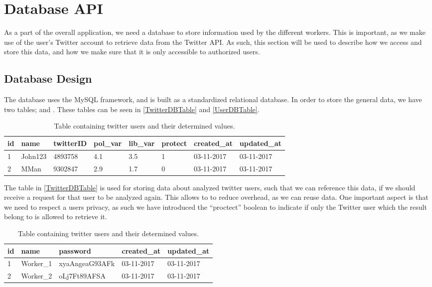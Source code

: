 \chapter{Database API}
As a part of the overall application, we need a database to store information
used by the different workers. This is important, as we make use of the
user's Twitter account to retrieve data from the Twitter API. As such, this
section will be used to describe how we access and store this data, and how we
make sure that it is only accessible to authorized users.

\section{Database Design}\label{DBDesign}
The database uses the MySQL framework, and is built as a standardized relational
database. In order to store the general data, we have two tables; 
and . These tables can be seen in \autoref{TwitterDBTable}
and \autoref{UserDBTable}.

\begin{table}[H]
\begin{tabular}{l | l | l | l | l | l | l | l	}
\textbf{id} & \textbf{name} & \textbf{twitterID} & \textbf{pol\_var} &
\textbf{lib\_var} & \textbf{protect} & \textbf{created\_at} & \textbf{updated\_at}
\\\hline 1 & John123 & 4893758 & 4.1 & 3.5 & 1 & 03-11-2017 & 03-11-2017 
\\\hline 2 & MMan & 9302847 & 2.9 & 1.7 & 0 & 03-11-2017 & 03-11-2017 
\\\hline
\end{tabular}
\caption{Table containing twitter users and their determined values.}
\label{TwitterDBTable}
\end{table}

The table in \autoref{TwitterDBTable} is used for storing data about analyzed
twitter users, such that we can reference this data, if we should receive
a request for that user to be analyzed again. This allows to to reduce overhead,
as we can reuse data. One important aspect is that we need to respect a users
privacy, as such we have introduced the ``proctect'' boolean to indicate if only
the Twitter user which the result belong to is allowed to retrieve it.

\begin{table}[H]
\begin{tabular}{l | l | l | l | l }
\textbf{id} & \textbf{name} & \textbf{password} &
\textbf{created\_at} & \textbf{updated\_at}\\\hline
1 & Worker\_1 & xyaAngeaG93AFk & 03-11-2017 & 03-11-2017
\\\hline
2 & Worker\_2 & oLj7Ft89AFSA & 03-11-2017 & 03-11-2017 \\\hline
\end{tabular}
\caption{Table containing twitter users and their determined values.}
\label{UserDBTable}
\end{table}

